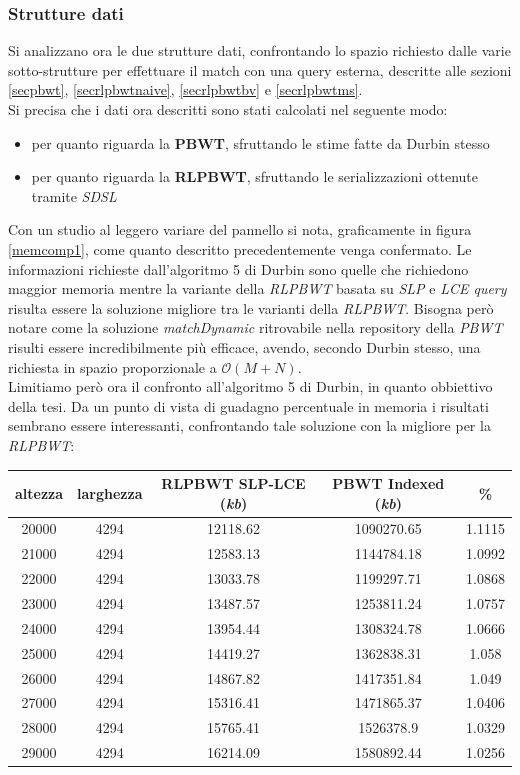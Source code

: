 \subsubsection{Strutture dati}
Si analizzano ora le due strutture dati, confrontando lo spazio richiesto dalle
varie sotto-strutture per effettuare il match con una query esterna, descritte
alle sezioni \ref{secpbwt}, \ref{secrlpbwtnaive}, \ref{secrlpbwtbv} e
\ref{secrlpbwtms}.\\
Si precisa che i dati ora descritti sono stati calcolati nel seguente modo:
\begin{itemize}
  \item per quanto riguarda la \textbf{PBWT}, sfruttando le stime fatte da
  Durbin stesso
  \item per quanto riguarda la \textbf{RLPBWT}, sfruttando le serializzazioni
  ottenute tramite \textit{SDSL}
\end{itemize}
Con un studio al leggero variare del pannello si nota, graficamente in figura
\ref{memcomp1}, come quanto descritto precedentemente venga confermato. Le
informazioni richieste dall'algoritmo 5 di Durbin sono quelle che richiedono
maggior memoria mentre la variante della \textit{RLPBWT} basata su \textit{SLP}
e \textit{LCE query} risulta essere la soluzione migliore tra le varianti della
\textit{RLPBWT}. Bisogna però notare come la soluzione \textit{matchDynamic}
ritrovabile nella repository della \textit{PBWT} risulti essere incredibilmente
più efficace, avendo, secondo Durbin stesso, una richiesta in spazio
proporzionale a $\mathcal{O}(M+N)$. \\
Limitiamo però ora il confronto all'algoritmo 5 di Durbin, in quanto obbiettivo
della tesi. Da un punto di vista di guadagno percentuale in memoria i risultati
sembrano essere interessanti, confrontando tale soluzione con la migliore per la
\textit{RLPBWT}:
\begin{table}[H]
  \centering
  \footnotesize
  \begin{tabular}{c|c|c|c|c}
    \textbf{altezza} & \textbf{larghezza}
    & \textbf{RLPBWT SLP-LCE (\textit{kb})}
    & \textbf{PBWT Indexed (\textit{kb})} & \textbf{\%}\\
    \hline
    20000 & 4294 & 12118.62 & 1090270.65 & 1.1115\\
    21000 & 4294 & 12583.13 & 1144784.18 & 1.0992\\
    22000 & 4294 & 13033.78 & 1199297.71 & 1.0868\\
    23000 & 4294 & 13487.57 & 1253811.24 & 1.0757\\
    24000 & 4294 & 13954.44 & 1308324.78 & 1.0666\\
    25000 & 4294 & 14419.27 & 1362838.31 & 1.058\\
    26000 & 4294 & 14867.82 & 1417351.84 & 1.049\\
    27000 & 4294 & 15316.41 & 1471865.37 & 1.0406\\
    28000 & 4294 & 15765.41 & 1526378.9 & 1.0329\\
    29000 & 4294 & 16214.09 & 1580892.44 & 1.0256\\
  \end{tabular}
\end{table}
